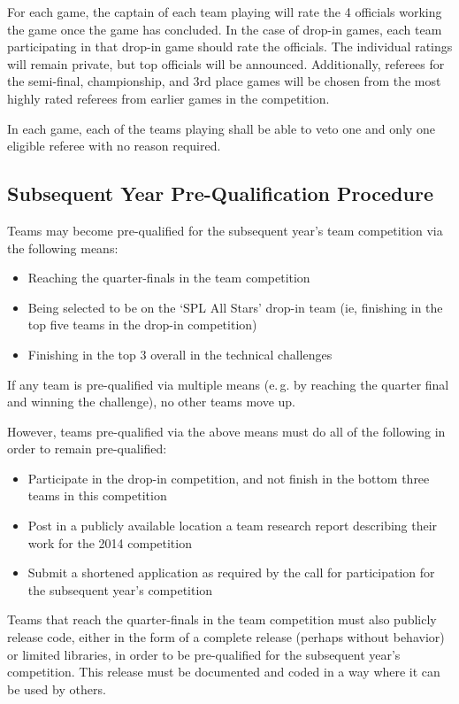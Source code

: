 \documentclass[12pt]{article}
\newcommand{\eg}{\mbox{e.\,g.}\xspace}
\begin{document}
For each game, the captain of each team playing will rate the 4 officials working the game once the game has concluded.  In the case of drop-in games, each team participating in that drop-in game should rate the officials.  The individual ratings will remain private, but top officials will be announced.  Additionally, referees for the semi-final, championship, and 3rd place games will be chosen from the most highly rated referees from earlier games in the competition.

In each game, each of the teams playing shall be able to veto one and only one eligible referee with no reason required.

\subsection{Subsequent Year Pre-Qualification Procedure}
\label{sec:preQual}
Teams may become pre-qualified for the subsequent year's team competition via the following means:
\begin{itemize}
\item Reaching the quarter-finals in the team competition
\item Being selected to be on the `SPL All Stars' drop-in team (ie, finishing in the top five teams in the drop-in competition)
\item Finishing in the top 3 overall in the technical challenges
\end{itemize}
If any team is pre-qualified via multiple means (\eg by reaching the quarter final and winning the challenge), no other teams move up.

However, teams pre-qualified via the above means must do all of the following in order to remain pre-qualified:
\begin{itemize}
\item Participate in the drop-in competition, and not finish in the bottom three teams in this competition
\item Post in a publicly available location a team research report describing their work for the 2014 competition
\item Submit a shortened application as required by the call for participation for the subsequent year's competition
\end{itemize}

Teams that reach the quarter-finals in the team competition must also publicly release code, either in the form of a complete release (perhaps without behavior) or limited libraries, in order to be pre-qualified for the subsequent year's competition.  This release must be documented and coded in a way where it can be used by others.
\end{document}
